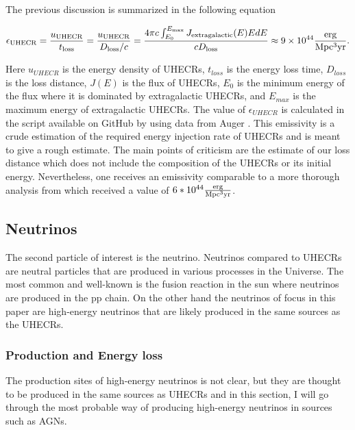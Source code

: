 The previous discussion is summarized in the following equation 

\begin{equation}
    \epsilon_{\rm UHECR} = \frac{u_{\rm UHECR}}{t_{\rm loss}} = \frac{u_{\rm UHECR}}{D_{\rm loss}/c} = \frac{4\pi c \int_{E_0}^{E_{\rm max}}J_{\rm extragalactic}(E)E dE}{c D_{\rm loss}} \approx 9\times 10^{44} \frac{\rm erg}{\rm Mpc^3 \rm yr}.
\end{equation}

Here $u_{UHECR}$ is the energy density of UHECRs, $t_{loss}$ is the energy loss time, $D_{loss}$ is the loss distance, $J(E)$ is the flux of UHECRs, $E_0$ is the minimum energy of the flux where it is dominated by extragalactic UHECRs, and $E_{max}$ is the maximum energy of extragalactic UHECRs.
The value of $\epsilon_{UHECR}$ is calculated in the script available on GitHub \cite{Andrews_2023_github} by using data from  Auger \cite{thepierreaugercollaboration2017pierre}. This emissivity is a crude estimation of the required energy injection rate of UHECRs and is meant to give a rough estimate. 
The main points of criticism are the estimate of our loss distance which does not include the composition of the UHECRs or its initial energy. Nevertheless, one receives an emissivity comparable to a more thorough analysis from \cite{PhysRevLett.125.121106} which received a value of $6*10^{44} \frac{\rm erg}{\rm Mpc^3 \rm yr}$.




\subsection{Neutrinos}

The second particle of interest is the neutrino. Neutrinos compared to UHECRs are neutral particles that are produced in various processes in the Universe.
The most common and well-known is the fusion reaction in the sun where neutrinos are produced in the pp chain. On the other hand the neutrinos of focus in this paper 
are high-energy neutrinos that are likely produced in the same sources as the UHECRs.



\subsubsection{Production and Energy loss}
The production sites of high-energy neutrinos is not clear, but they are thought to be produced in the same sources as UHECRs 
and in this section, I will go through the most probable way of producing high-energy neutrinos in sources such as AGNs.

